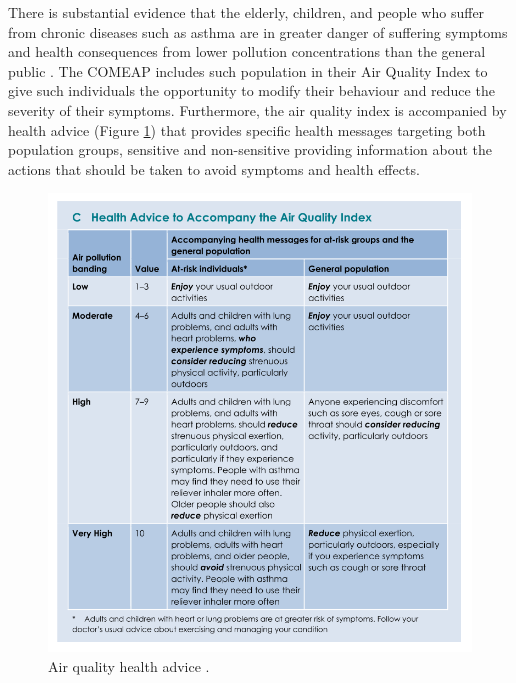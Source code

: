 There is substantial evidence that the elderly, children, and people who suffer from chronic diseases such as asthma are in greater danger of suffering symptoms and health consequences from lower pollution concentrations than the general public \cite{Koenig1999} \cite{Kampa2008} \cite{Zones2010}. The COMEAP includes such population in their Air Quality Index to give such individuals the opportunity to modify their behaviour and reduce the severity of their symptoms. Furthermore, the air quality index is accompanied by health advice (Figure \ref{fig:air_quality_health_advice}) that provides specific health messages targeting both population groups, sensitive and non-sensitive providing information about the actions that should be taken to avoid symptoms and health effects.

\begin{figure}[H]
\begin{adjustbox}{width=1\textwidth,center=\textwidth}
  \centering
  \includegraphics[scale=.8]{images/air_quality_health_advice.png}
\end{adjustbox}
  \caption[Air quality health advice]{Air quality health advice \cite{HealthProtectionAgencyfortheCommitteeontheMedicalEffectsofAirPollutants2011}.}
  \label{fig:air_quality_health_advice}
\end{figure}


